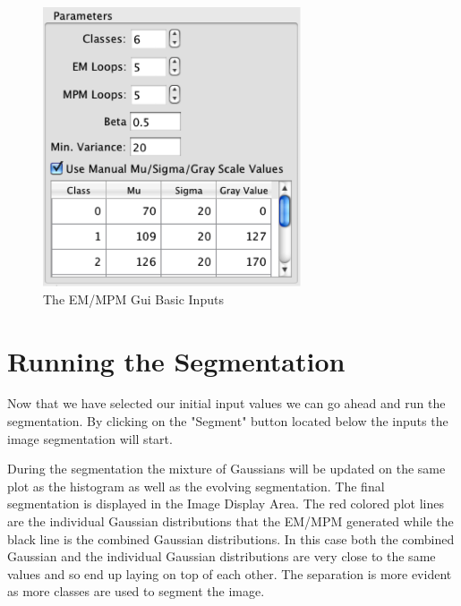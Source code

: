\documentclass[12pt,oneside]{book}
\begin{document}
\begin{figure}[htbp]
\begin{center}
\includegraphics[width=3.0in]{images/Untitled3.png}
\caption{The EM/MPM Gui Basic Inputs}
\label{image3}
\end{center}
\end{figure}

\section{Running the Segmentation}
Now that we have selected our initial input values we can go ahead and run the segmentation. By clicking on the "Segment" button located below the inputs the image segmentation will start. 


 During the segmentation the mixture of Gaussians will be updated on the same plot as the histogram as well as the evolving segmentation. The final segmentation is displayed in the Image Display Area. The red colored plot lines are the individual Gaussian distributions that the EM/MPM generated while the black line is the combined Gaussian distributions. In this case both the combined Gaussian and the individual Gaussian distributions are very close to the same values and so end up laying on top of each other. The separation is more evident as more classes are used to segment the image. 
 
\end{document}
